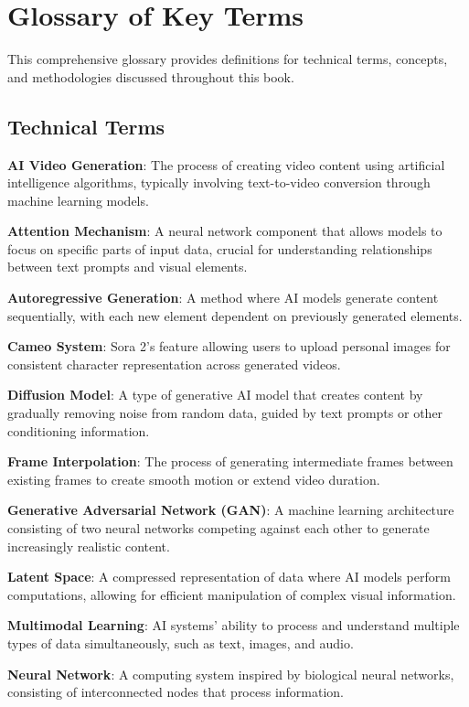 \chapter{Glossary of Key Terms}
\label{app:glossary}

This comprehensive glossary provides definitions for technical terms, concepts, and methodologies discussed throughout this book.

\section{Technical Terms}

\textbf{AI Video Generation}: The process of creating video content using artificial intelligence algorithms, typically involving text-to-video conversion through machine learning models.

\textbf{Attention Mechanism}: A neural network component that allows models to focus on specific parts of input data, crucial for understanding relationships between text prompts and visual elements.

\textbf{Autoregressive Generation}: A method where AI models generate content sequentially, with each new element dependent on previously generated elements.

\textbf{Cameo System}: Sora 2's feature allowing users to upload personal images for consistent character representation across generated videos.

\textbf{Diffusion Model}: A type of generative AI model that creates content by gradually removing noise from random data, guided by text prompts or other conditioning information.

\textbf{Frame Interpolation}: The process of generating intermediate frames between existing frames to create smooth motion or extend video duration.

\textbf{Generative Adversarial Network (GAN)}: A machine learning architecture consisting of two neural networks competing against each other to generate increasingly realistic content.

\textbf{Latent Space}: A compressed representation of data where AI models perform computations, allowing for efficient manipulation of complex visual information.

\textbf{Multimodal Learning}: AI systems' ability to process and understand multiple types of data simultaneously, such as text, images, and audio.

\textbf{Neural Network}: A computing system inspired by biological neural networks, consisting of interconnected nodes that process information.


